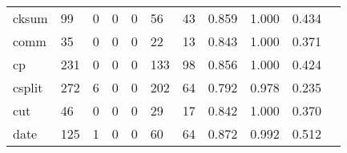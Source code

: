 \begin{longtable}{lp{1.2cm}p{1.2cm}p{1.2cm}p{1.2cm}p{1.2cm}p{1.2cm}p{1.2cm}p{1.2cm}p{1.2cm}p{1.2cm}}
cksum     &                                    99 &                                                  0 &                                                  0 &                                                  0 &                                                 56 &                                                 43 &                                         0.859 &                                              1.000 &                                              0.434 \\
comm      &                                    35 &                                                  0 &                                                  0 &                                                  0 &                                                 22 &                                                 13 &                                         0.843 &                                              1.000 &                                              0.371 \\
cp        &                                   231 &                                                  0 &                                                  0 &                                                  0 &                                                133 &                                                 98 &                                         0.856 &                                              1.000 &                                              0.424 \\
csplit    &                                   272 &                                                  6 &                                                  0 &                                                  0 &                                                202 &                                                 64 &                                         0.792 &                                              0.978 &                                              0.235 \\
cut       &                                    46 &                                                  0 &                                                  0 &                                                  0 &                                                 29 &                                                 17 &                                         0.842 &                                              1.000 &                                              0.370 \\
date      &                                   125 &                                                  1 &                                                  0 &                                                  0 &                                                 60 &                                                 64 &                                         0.872 &                                              0.992 &                                              0.512 \\

\end{longtable}
